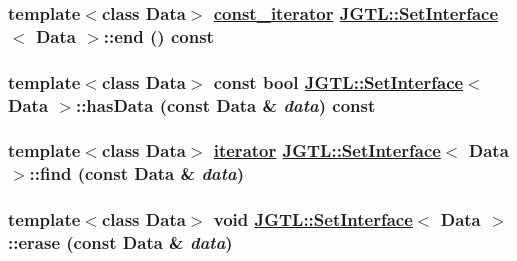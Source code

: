 \hypertarget{class_j_g_t_l_1_1_set_interface_6675901f9ae1bb5c35bd45d33bb22a12}{
\subsubsection[end]{\setlength{\rightskip}{0pt plus 5cm}template$<$class Data$>$ \hyperlink{class_j_g_t_l_1_1_set_interface_1e545e77790db36de24904dc70054225}{const\_\-iterator} \hyperlink{class_j_g_t_l_1_1_set_interface}{JGTL::Set\-Interface}$<$ Data $>$::end () const}}
\label{class_j_g_t_l_1_1_set_interface_6675901f9ae1bb5c35bd45d33bb22a12}


\hypertarget{class_j_g_t_l_1_1_set_interface_8dbec0353ff7027964473366508a417d}{
\subsubsection[hasData]{\setlength{\rightskip}{0pt plus 5cm}template$<$class Data$>$ const bool \hyperlink{class_j_g_t_l_1_1_set_interface}{JGTL::Set\-Interface}$<$ Data $>$::has\-Data (const Data \& {\em data}) const}}
\label{class_j_g_t_l_1_1_set_interface_8dbec0353ff7027964473366508a417d}


\hypertarget{class_j_g_t_l_1_1_set_interface_fef4fa91516c191180d9854eb2cc4f9a}{
\subsubsection[find]{\setlength{\rightskip}{0pt plus 5cm}template$<$class Data$>$ \hyperlink{class_j_g_t_l_1_1_set_interface_1f4b953e9a9adb5d463b6abb24623372}{iterator} \hyperlink{class_j_g_t_l_1_1_set_interface}{JGTL::Set\-Interface}$<$ Data $>$::find (const Data \& {\em data})}}
\label{class_j_g_t_l_1_1_set_interface_fef4fa91516c191180d9854eb2cc4f9a}


\hypertarget{class_j_g_t_l_1_1_set_interface_13066581738f291b78b56d20022dfd2a}{
\subsubsection[erase]{\setlength{\rightskip}{0pt plus 5cm}template$<$class Data$>$ void \hyperlink{class_j_g_t_l_1_1_set_interface}{JGTL::Set\-Interface}$<$ Data $>$::erase (const Data \& {\em data})}}
\label{class_j_g_t_l_1_1_set_interface_13066581738f291b78b56d20022dfd2a}



